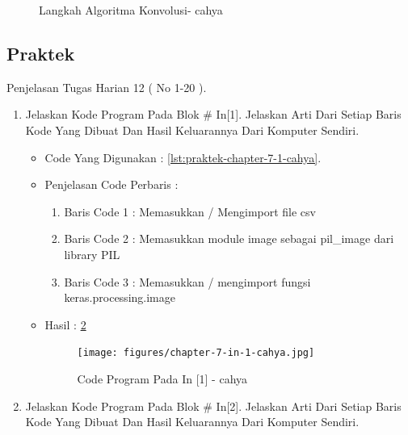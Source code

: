 \begin{enumerate}
\begin{itemize}
\begin{figure}[!hbtp]
\caption{Langkah Algoritma Konvolusi- cahya}
\label{chapter-7-13-cahya}
\end{figure}
\par
\par
\end{itemize}
\end{enumerate}


\subsection{Praktek}
Penjelasan Tugas Harian 12 ( No 1-20 ).
\begin{enumerate}
\item Jelaskan Kode Program Pada Blok \# In[1]. Jelaskan Arti Dari Setiap Baris Kode Yang Dibuat Dan Hasil Keluarannya Dari Komputer Sendiri.
\begin{itemize}
\item Code Yang Digunakan : \ref{lst:praktek-chapter-7-1-cahya}.

\par
\par
\item Penjelasan Code Perbaris	: 
\begin{enumerate}
\item Baris Code 1	: Memasukkan / Mengimport file csv
\item Baris Code 2	: Memasukkan module image sebagai pil\_image dari library PIL
\item Baris Code 3	: Memasukkan / mengimport fungsi keras.processing.image 
\end{enumerate}
\par
\item Hasil : \ref{chapter-7-in-1-cahya}
\par
\par
\begin{figure}[!hbtp]
\centering
\texttt{[image: figures/chapter-7-in-1-cahya.jpg]}
\caption{Code Program Pada In [1] - cahya}
\label{chapter-7-in-1-cahya}
\end{figure}
\par
\par
\end{itemize}
\par
\par
\par
\item Jelaskan Kode Program Pada Blok \# In[2]. Jelaskan Arti Dari Setiap Baris Kode Yang Dibuat Dan Hasil Keluarannya Dari Komputer Sendiri.

\end{enumerate}
